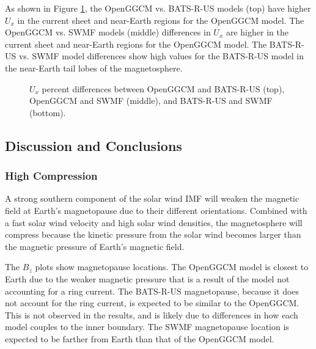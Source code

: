 As shown in Figure
\ref{fig:UxDiffLowBeginning}, the OpenGGCM vs. BATS-R-US models (top) have higher
$U_x$ in the current sheet and near-Earth regions for the OpenGGCM model. The
OpenGGCM vs. SWMF models (middle) differences in $U_x$ are higher in the current
sheet and near-Earth regions for the OpenGGCM model. The BATS-R-US vs. SWMF
model differences show high values for the BATS-R-US model in the near-Earth tail
lobes of the magnetosphere.
\begin{figure}
	\centering
    \caption{$U_x$ percent differences between OpenGGCM and BATS-R-US (top),
    OpenGGCM and SWMF (middle), and BATS-R-US and SWMF (bottom).
    }
    \label{fig:UxDiffLowBeginning}
	\figSpace
\end{figure}

\subsection{Discussion and Conclusions}
\subsubsection{High Compression}

A strong southern component of the solar wind IMF will weaken the magnetic
field at Earth's magnetopause due to their different orientations. Combined with a
fast solar wind velocity and high solar wind densities, the magnetosphere will
compress because the kinetic pressure from the solar wind
becomes larger than the magnetic pressure of Earth's magnetic field.

The $B_z$ plots show magnetopause locations. The OpenGGCM model
is closest to Earth due to the weaker magnetic pressure that is a result of the model
not accounting for a ring current. The BATS-R-US magnetopause, because it does
not account for the ring current, is expected to be similar to the OpenGGCM. This is not
observed in the results, and is likely due to differences in how each model
couples to the inner boundary. The SWMF magnetopause location
is expected to be farther from Earth than that of the OpenGGCM model.

